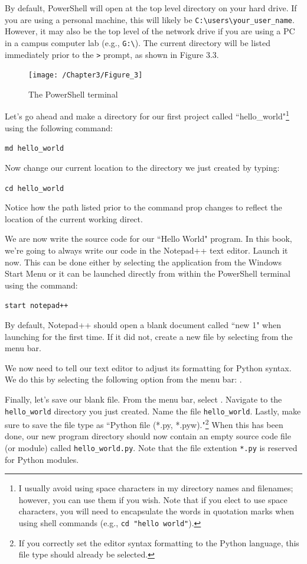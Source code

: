 \documentclass{book}
\begin{document}
By default, PowerShell will open at the top level directory on your hard drive. If you are using a personal machine, this will likely be \texttt{C:\textbackslash users\textbackslash your\_user\_name}. However, it may also be the top level of the network drive if you are using a PC in a campus computer lab (e.g., \texttt{G:\textbackslash}). The current directory will be listed immediately prior to the \texttt{>} prompt, as shown in Figure 3.3.

\begin{figure}[h]
	\caption{The PowerShell terminal}
	\centering\texttt{[image: /Chapter3/Figure\_3]}
\end{figure}

Let's go ahead and make a directory for our first project called ``hello\_world"\footnote{I usually avoid using space characters in my directory names and filenames; however, you can use them if you wish. Note that if you elect to use space characters, you will need to encapsulate the words in quotation marks when using shell commands (e.g., \texttt{cd "hello world"}).} using the following command:

\texttt{md hello\_world}

Now change our current location to the directory we just created by typing:

\texttt{cd hello\_world}

Notice how the path listed prior to the command prop changes to reflect the location of the current working direct. 

We are now write the source code for our ``Hello World" program. In this book, we're going to always write our code in the Notepad++ text editor. Launch it now. This can be done either by selecting the application from the Windows Start Menu or it can be launched directly from within the PowerShell terminal using the command:

\texttt{start notepad++}

By default, Notepad++ should open a blank document called ``new 1" when launching for the first time. If it did not, create a new file by selecting  from the menu bar. 

We now need to tell our text editor to adjust its formatting for Python syntax. We do this by selecting the following option from the menu bar: . 

Finally, let's save our blank file. From the menu bar, select . Navigate to the \texttt{hello\_world} directory you just created. Name the file \texttt{hello\_world}. Lastly, make sure to save the file type as ``Python file (*.py, *.pyw)."\footnote{If you correctly set the editor syntax formatting to the Python language, this file type should already be selected.} When this has been done, our new program directory should now contain an empty source code file (or module) called \texttt{hello\_world.py}. Note that the file extention \texttt{*.py} is reserved for Python modules.
\end{document}
